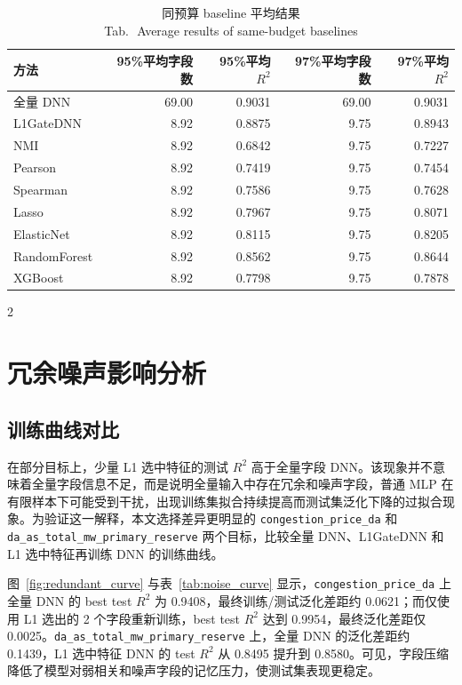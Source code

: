 \documentclass[UTF8,zihao=5,twoside]{ctexart}
\numberwithin{equation}{section}
\newcommand{\tabbicaption}[2]{%
  \caption{#1\\[-0.2em]\small Tab.\,\thetable\ #2}
}
\newcommand{\code}[1]{\texttt{#1}}
\begin{document}
\begin{table}[H]
\centering
\tabbicaption{同预算 baseline 平均结果}{Average results of same-budget baselines}
\label{tab:budget_avg}
\begin{tabular}{lrrrr}
\toprule
方法 & 95\%平均字段数 & 95\%平均$R^2$ & 97\%平均字段数 & 97\%平均$R^2$ \\
\midrule
全量 DNN & 69.00 & 0.9031 & 69.00 & 0.9031 \\
L1GateDNN & 8.92 & 0.8875 & 9.75 & 0.8943 \\
NMI & 8.92 & 0.6842 & 9.75 & 0.7227 \\
Pearson & 8.92 & 0.7419 & 9.75 & 0.7454 \\
Spearman & 8.92 & 0.7586 & 9.75 & 0.7628 \\
Lasso & 8.92 & 0.7967 & 9.75 & 0.8071 \\
ElasticNet & 8.92 & 0.8115 & 9.75 & 0.8205 \\
RandomForest & 8.92 & 0.8562 & 9.75 & 0.8644 \\
XGBoost & 8.92 & 0.7798 & 9.75 & 0.7878 \\
\bottomrule
\end{tabular}
\end{table}

\begin{multicols}{2}

\section{冗余噪声影响分析}
\subsection{训练曲线对比}
在部分目标上，少量 L1 选中特征的测试 $R^2$ 高于全量字段 DNN。该现象并不意味着全量字段信息不足，而是说明全量输入中存在冗余和噪声字段，普通 MLP 在有限样本下可能受到干扰，出现训练集拟合持续提高而测试集泛化下降的过拟合现象。为验证这一解释，本文选择差异更明显的 \code{congestion\_price\_da} 和 \code{da\_as\_total\_mw\_primary\_reserve} 两个目标，比较全量 DNN、L1GateDNN 和 L1 选中特征再训练 DNN 的训练曲线。

图~\ref{fig:redundant_curve} 与表~\ref{tab:noise_curve} 显示，\code{congestion\_price\_da} 上全量 DNN 的 best test $R^2$ 为 0.9408，最终训练/测试泛化差距约 0.0621；而仅使用 L1 选出的 2 个字段重新训练，best test $R^2$ 达到 0.9954，最终泛化差距仅 0.0025。\code{da\_as\_total\_mw\_primary\_reserve} 上，全量 DNN 的泛化差距约 0.1439，L1 选中特征 DNN 的 test $R^2$ 从 0.8495 提升到 0.8580。可见，字段压缩降低了模型对弱相关和噪声字段的记忆压力，使测试集表现更稳定。

\end{multicols}
\end{document}
